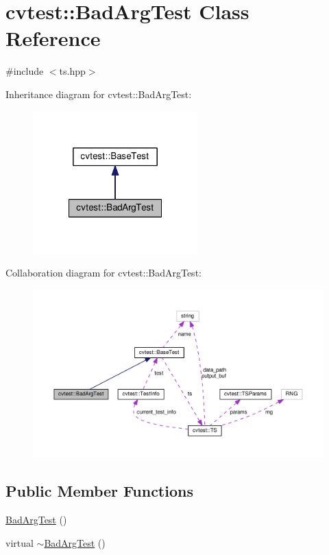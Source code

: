 \hypertarget{classcvtest_1_1BadArgTest}{\section{cvtest\-:\-:Bad\-Arg\-Test Class Reference}
\label{classcvtest_1_1BadArgTest}
}


{\ttfamily \#include $<$ts.\-hpp$>$}



Inheritance diagram for cvtest\-:\-:Bad\-Arg\-Test\-:\nopagebreak
\begin{figure}[H]
\begin{center}
\leavevmode
\includegraphics[width=180pt]{classcvtest_1_1BadArgTest__inherit__graph}
\end{center}
\end{figure}


Collaboration diagram for cvtest\-:\-:Bad\-Arg\-Test\-:\nopagebreak
\begin{figure}[H]
\begin{center}
\leavevmode
\includegraphics[width=350pt]{classcvtest_1_1BadArgTest__coll__graph}
\end{center}
\end{figure}
\subsection*{Public Member Functions}
\begin{DoxyCompactItemize}
\item 
\hyperlink{classcvtest_1_1BadArgTest_a2d4a428e6e4600fb4104cf8ed5e9aed5}{Bad\-Arg\-Test} ()
\item 
virtual \hyperlink{classcvtest_1_1BadArgTest_a8654de3ad58541ee657ac47cbf112974}{$\sim$\-Bad\-Arg\-Test} ()
\end{DoxyCompactItemize}

